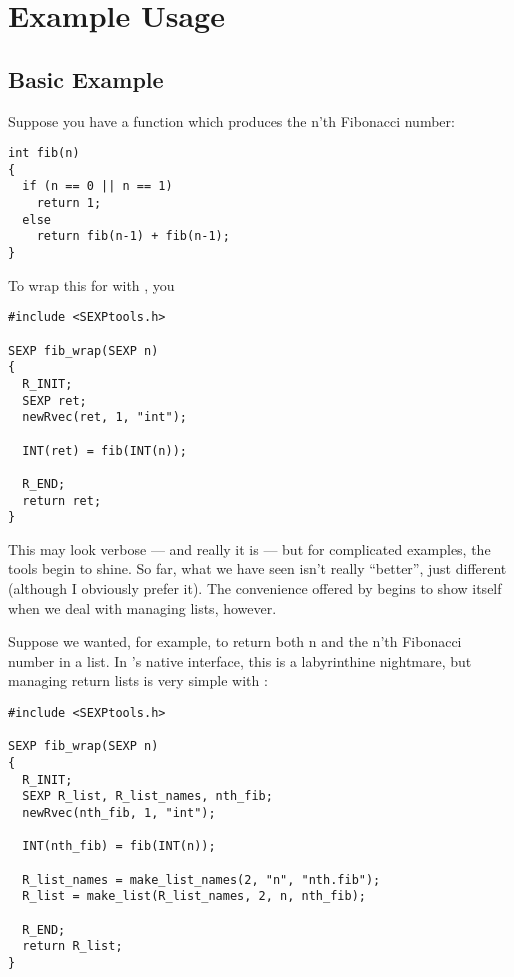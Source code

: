 \section{Example Usage}\label{example}


\subsection{Basic Example}

Suppose you have a \C function  which produces the n'th 
Fibonacci number:
\begin{lstlisting}[language=fanC,title=Fibonacci]
int fib(n)
{
  if (n == 0 || n == 1)
    return 1;
  else
    return fib(n-1) + fib(n-1);
}
\end{lstlisting}

To wrap this for \R with \thispackage, you 
\begin{lstlisting}[language=fanC,title=Fibonacci Wrapper]
#include <SEXPtools.h>

SEXP fib_wrap(SEXP n)
{
  R_INIT;
  SEXP ret;
  newRvec(ret, 1, "int");
  
  INT(ret) = fib(INT(n));
  
  R_END;
  return ret;
}
\end{lstlisting}

This may look verbose --- and really it is --- but for complicated examples, 
the tools begin to shine.  So far, what we have seen isn't really ``better'', 
just different (although I obviously prefer it).  The convenience offered by 
\thispackage begins to show itself when we deal with managing lists, however.

Suppose we wanted, for example, to return both n and 
the n'th Fibonacci number in a list.  In \R's native \C interface, this is a 
labyrinthine nightmare, but managing return lists is very simple with 
\thispackage:

\begin{lstlisting}[language=fanC,title=Fibonacci Wrapper 2]
#include <SEXPtools.h>

SEXP fib_wrap(SEXP n)
{
  R_INIT;
  SEXP R_list, R_list_names, nth_fib;
  newRvec(nth_fib, 1, "int");
  
  INT(nth_fib) = fib(INT(n));
  
  R_list_names = make_list_names(2, "n", "nth.fib");
  R_list = make_list(R_list_names, 2, n, nth_fib);
  
  R_END;
  return R_list;
}
\end{lstlisting}

